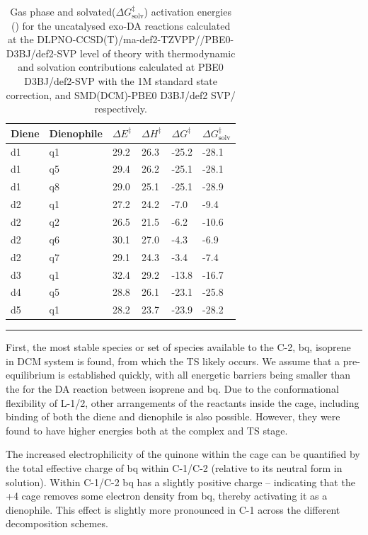 \documentclass[../../main.tex]{subfiles}
\begin{document}
\begin{table}[h!]
	\def\arraystretch{1.7}
	\begin{tabularx}{\textwidth}{YYYYYY}
		\hline
		Diene	&Dienophile	&$\Delta E^\ddagger$ &$\Delta H^\ddagger$&	$\Delta G^\ddagger$	&$\Delta G^\ddagger_\text{solv}$ \\
		\hline
		d1&	q1	&29.2&	26.3&	-25.2&	-28.1
\\
		d1	&q5	&29.4&	26.2&	-25.1&	-28.1
\\
		d1&	q8	&29.0&	25.1&	-25.1&	-28.9\\
		d2&	q1	&27.2&	24.2&	-7.0&	-9.4
\\
		d2&	q2	&26.5&	21.5&	-6.2&	-10.6
\\
		d2&	q6	&30.1	&27.0&	-4.3&	-6.9
\\
		d2&	q7	&29.1&	24.3&	-3.4&	-7.4
\\
		d3&	q1	&32.4&	29.2&	-13.8&	-16.7
\\
		d4&	q5	&28.8&	26.1&	-23.1&	-25.8
\\
		d5&	q1	&28.2	&23.7&	-23.9&	-28.2\\
	\end{tabularx}
	\hrule
	\vspace{0.2cm}
	\caption{Gas phase and solvated($\Delta G^\ddagger_\text{solv}$) activation energies (\kcal) for the uncatalysed exo-DA reactions calculated at the DLPNO-CCSD(T)/ma-def2-TZVPP//PBE0-D3BJ/def2-SVP level of theory with thermodynamic and solvation contributions calculated at PBE0 D3BJ/def2-SVP with the 1M standard state correction, and SMD(DCM)-PBE0 D3BJ/def2 SVP/ respectively.}
	\label{table::si_da_15}
\end{table}


First, the most stable species or set of species available to the C-2, bq, isoprene in DCM system is found, from which the TS likely occurs. We assume that a pre-equilibrium is established quickly, with all energetic barriers being smaller than the for the DA reaction between isoprene and bq. Due to the conformational flexibility of L-1/2, other arrangements of the reactants inside the cage, including binding of both the diene and dienophile is also possible. However, they were found to have higher energies both at the complex and TS stage. 

The increased electrophilicity of the quinone within the cage can be quantified by the total effective charge of bq within C-1/C-2 (relative to its neutral form in solution). Within C-1/C-2 bq has a slightly positive charge – indicating that the +4 cage removes some electron density from bq, thereby activating it as a dienophile. This effect is slightly more pronounced in C-1 across the different decomposition schemes.
\end{document}
